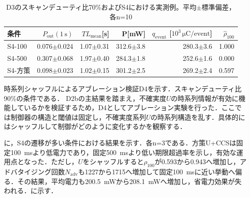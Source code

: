 \begin{table}[tb]
  \centering
  \caption{D3のスキャンデューティ比70\%およびS4における実測例。平均$\pm$標準偏差，各n=10}
  \label{tab:d3_summary}
  {\small
  \setlength{\tabcolsep}{4pt}
  \begin{tabular}{lrrrrr}
    \toprule
    条件 & $P_{\mathrm{out}}(1\,\mathrm{s})$ & $TL_{\mathrm{mean}}$[s] & P[mW] & $q_{\mathrm{event}}$ [$10^3\,\si{\micro\coulomb}/\text{event}$] & $\hat{\rho}_{100}$ \\
    \midrule
    S4-100   & 0.076$\pm$0.024 & 1.07$\pm$0.31 & 312.6$\pm$3.8 & 280.3$\pm$3.6 & 1.000 \\
    S4-500   & 0.307$\pm$0.068 & 1.97$\pm$0.40 & 284.3$\pm$1.8 & 252.6$\pm$1.6 & 0.000 \\
    S4-方策 & 0.098$\pm$0.023 & 1.02$\pm$0.15 & 301.2$\pm$2.5 & 269.2$\pm$2.4 & 0.597 \\
    \bottomrule
  \end{tabular}
  }
\end{table}
時系列シャッフルによるアブレーション検証D4を示す．スキャンデューティ比90\%の条件である．
\label{sec:d4_ablation}
D2bの主結果を踏まえ，不確実度$U$の時系列情報が有効に機能しているかを検証するため，D4としてアブレーション実験を行った．ここでは制御器の構造と閾値は固定し，不確実度系列$U$の時系列構造を乱す．具体的にはシャッフルして制御がどのように変化するかを観察する．

に，S4の遷移が多い条件における結果を示す．各n=3である．方策U+CCSは固定\SI{100}{\milli\second}より低電力であり，固定\SI{500}{\milli\second}より低い期限超過率を示し，有効な運用点となった．ただし，$U$をシャッフルすると$\rho_{100}$が0.593から0.943へ増加し，アドバタイジング回数$N_{\mathrm{adv}}$も1227から1715へ増加して固定\SI{100}{\milli\second}に近い挙動へ偏る．その結果，平均電力も\SI{200.5}{\milli\watt}から\SI{208.1}{\milli\watt}へ増加し，省電力効果が失われる．に示す．

